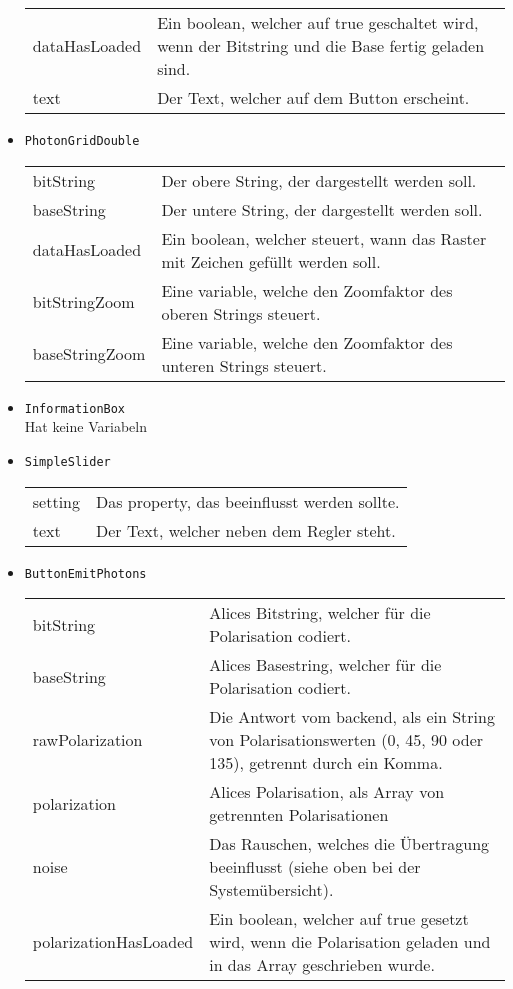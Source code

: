 \begin{itemize}
\begin{tabularx}{\textwidth}{p{4.5cm}p{9.5cm}}
dataHasLoaded & Ein boolean, welcher auf true geschaltet wird, wenn der Bitstring und die Base fertig geladen sind. \\
text &  Der Text, welcher auf dem Button erscheint. 
\end{tabularx}
\item \texttt{PhotonGridDouble}\\
\begin{tabularx}{\textwidth}{p{4.5cm}p{9.5cm}} 
bitString & Der obere String, der dargestellt werden soll. \\
baseString & Der untere String, der dargestellt werden soll. \\
dataHasLoaded & Ein boolean, welcher steuert, wann das Raster mit Zeichen gefüllt werden soll. \\
bitStringZoom & Eine variable, welche den Zoomfaktor des oberen Strings steuert. \\
baseStringZoom & Eine variable, welche den Zoomfaktor des unteren Strings steuert.
\end{tabularx}
\item \texttt{InformationBox} \\
Hat keine Variabeln
\item \texttt{SimpleSlider} \\
\begin{tabularx}{\textwidth}{p{4.5cm}p{9.5cm}} 
setting & Das property, das beeinflusst werden sollte. \\
text & Der Text, welcher neben dem Regler steht.
\end{tabularx}
\item \texttt{ButtonEmitPhotons} \\
\begin{tabularx}{\textwidth}{p{4.5cm}p{9.5cm}} 
bitString & Alices Bitstring, welcher für die Polarisation codiert. \\
baseString & Alices Basestring, welcher für die Polarisation codiert. \\
rawPolarization & Die Antwort vom backend, als ein String von Polarisationswerten (0, 45, 90 oder 135), getrennt durch ein Komma. \\
polarization & Alices Polarisation, als Array von getrennten Polarisationen \\
noise &  Das Rauschen, welches die Übertragung beeinflusst (siehe oben bei der Systemübersicht). \\
polarizationHasLoaded & Ein boolean, welcher auf true gesetzt wird, wenn die Polarisation geladen und in das Array geschrieben wurde. \\

\end{tabularx}
\end{itemize}
